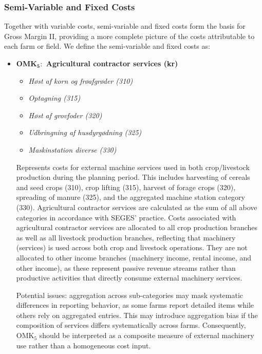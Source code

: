 \documentclass[12pt]{article}
\begin{document}
\subsubsection{Semi-Variable and Fixed Costs} 
Together with variable costs, semi-variable and fixed costs form the basis for Gross Margin II, providing a more complete picture of the costs attributable to each farm or field.
We define the semi-variable and fixed costs as:
\begin{itemize}
    \item[] \textbf{OMK$_\textbf{5}:$ Agricultural contractor services (kr)}
    \begin{itemize}
        \item[$+$] \textit{Høst af korn og frøafgrøder (310)}
        \item[$+$] \textit{Optagning (315)}
        \item[$+$] \textit{Høst af grovfoder (320)}
        \item[$+$] \textit{Udbringning af husdyrgødning (325)}
        \item[$+$] \textit{Maskinstation diverse (330)}
    \end{itemize}
    Represents costs for external machine services used in both crop/livestock production during the planning period. 
    This includes harvesting of cereals and seed crops (310), crop lifting (315), harvest of forage crops (320), spreading of manure (325), and the aggregated machine station category (330). 
    Agricultural contractor services are calculated as the sum of all above categories in accordance with SEGES' practice. 
    Costs associated with agricultural contractor services are allocated to all crop production branches as well as all livestock production branches, reflecting that machinery (services) is used across both crop and livestock operations.  
    They are not allocated to other income branches (machinery income, rental income, and other income), as these represent passive revenue streams rather than productive activities that directly consume external machinery services. 
    
    Potential issues: aggregation across sub-categories may mask systematic differences in reporting behavior, as some farms report detailed items while others rely on aggregated entries. This may introduce aggregation bias if the composition of services differs systematically across farms. Consequently, OMK$_5$ should be interpreted as a composite measure of external machinery use rather than a homogeneous cost input.
    

\end{itemize}
\end{document}
